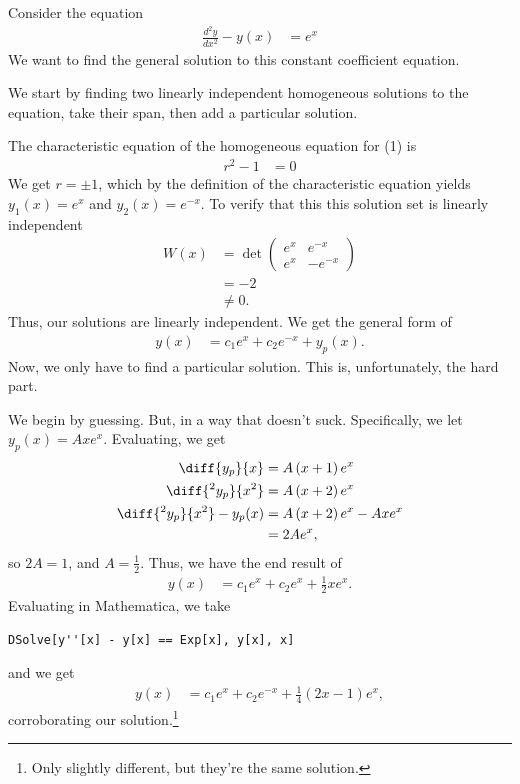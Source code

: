 \documentclass[10pt]{mypackage}
\begin{document}
\begin{example}
  Consider the equation
  \begin{align*}
    \frac{d^2y}{dx^2} - y(x) &= e^{x}\tag{1}
  \end{align*}
  We want to find the general solution to this constant coefficient equation.\newline

  We start by finding two linearly independent homogeneous solutions to the equation, take their span, then add a particular solution.\newline

  The characteristic equation of the homogeneous equation for (1) is
  \begin{align*}
    r^2 - 1 &= 0
  \end{align*}
  We get $r=\pm 1$, which by the definition of the characteristic equation yields $y_1(x) = e^{x}$ and $y_2(x) = e^{-x}$. To verify that this this solution set is linearly independent
  {\renewcommand{\arraystretch}{1.25}
    \begin{align*}
      W(x) &= \det \begin{pmatrix}e^{x} & e^{-x} \\ e^{x} & -e^{-x}\end{pmatrix}\\
           &= -2\\
           &\neq 0.
  \end{align*}
  }
  Thus, our solutions are linearly independent. We get the general form of
  \begin{align*}
    y(x) &= c_1e^{x} + c_2e^{-x} + y_p(x).
  \end{align*}
  Now, we only have to find a particular solution. This is, unfortunately, the hard part.\newline

  We begin by guessing. But, in a way that doesn't suck. Specifically, we let $y_p(x) = Axe^{x}$. Evaluating, we get
  \begin{align*}
    \diff{y_p}{x} &= A\left(x+1\right)e^{x}\\
    \diff{^2y_p}{x^2} &= A\left(x+2\right)e^{x}\\
     \diff{^2y_p}{x^2}- y_p(x) &= A\left(x+2\right)e^{x} - Axe^{x}\\
                        &= 2Ae^{x},
  \end{align*}
  so $2A = 1$, and $A = \frac{1}{2}$. Thus, we have the end result of
  \begin{align*}
    y(x) &= c_1e^{x} + c_2e^{x} + \frac{1}{2}xe^{x}.
  \end{align*}
  Evaluating in Mathematica, we take
  \begin{lstlisting}[style=mathematicastyle]
    DSolve[y''[x] - y[x] == Exp[x], y[x], x]
  \end{lstlisting}
  and we get
  \begin{align*}
    y(x) &= c_1e^{x} + c_2e^{-x} + \frac{1}{4}\left(2x-1\right)e^{x},
  \end{align*}
  corroborating our solution.\footnote{Only slightly different, but they're the same solution.}
\end{example}
\end{document}
